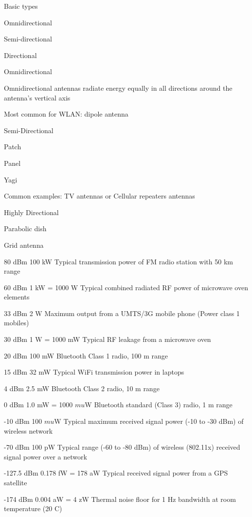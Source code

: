 \documentclass[9pt]{article}
\begin{document}
\begin{slide}
\begin{picture}
\end{picture}
\bi
	\item Basic types
	\bi
		\item Omnidirectional
		\item Semi-directional
		\item Directional
	\ei
	\item Omnidirectional
	\bi
		\item Omnidirectional antennas radiate energy equally in  all directions around the antenna's vertical axis
		\item Most common for WLAN: dipole antenna
	\ei
	\item Semi-Directional
	\bi
		\item Patch
		\item Panel
		\item Yagi
		\item Common examples: TV antennas or Cellular repeaters antennas
	\ei
	\item Highly Directional
	\bi
		\item Parabolic dish
		\item Grid antenna
	\ei
\ei
\end{slide}

\begin{slide}
\bi
	\item 80 dBm	100 kW	Typical transmission power of FM radio station with 50 km range
	\item 60 dBm	1 kW = 1000 W	Typical combined radiated RF power of microwave oven elements
	\item 33 dBm	2 W		Maximum output from a UMTS/3G mobile phone (Power class 1 mobiles)
	\item 30 dBm	1 W = 1000 mW	Typical RF leakage from a microwave oven
	\item 20 dBm	100 mW	Bluetooth Class 1 radio, 100 m range
	\item 15 dBm    32 mW	Typical WiFi transmission power in laptops
	\item  4 dBm     2.5 mW	Bluetooth Class 2 radio, 10 m range
	\item  0 dBm     1.0 mW = 1000 $mu$W	Bluetooth standard (Class 3) radio, 1 m range
	\item -10 dBm   100 $mu$W	Typical maximum received signal power (-10 to -30 dBm) of wireless network
	\item -70 dBm   100 pW	Typical range (-60 to -80 dBm) of wireless (802.11x) received signal power over a network
	\item -127.5 dBm	0.178 fW = 178 aW	Typical received signal power from a GPS satellite
	\item -174 dBm	0.004 aW = 4 zW		Thermal noise floor for 1 Hz bandwidth at room temperature (20 C)
\ei
\end{slide}
\end{document}
